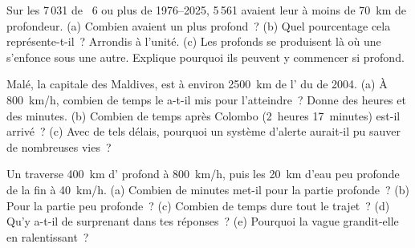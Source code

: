 \begin{exercise}[$\star\star$]\label{exo:g7:earthquakes:9}
Sur les 7\,031  de ~6 ou plus de 1976--2025, 5\,561
avaient leur  à moins de \qty{70}{km} de profondeur. (a) Combien
avaient un  plus profond~? (b) Quel pourcentage cela représente-t-il~?
Arrondis à l'unité. (c) Les  profonds se produisent là où une
 s'enfonce sous une autre. Explique pourquoi ils peuvent y commencer
si profond.
\end{exercise}

\begin{exercise}[$\star\star$]\label{exo:g7:earthquakes:10}
Malé, la capitale des Maldives, est à environ \qty{2500}{km} de
l' du  de 2004. (a) À \qty{800}{km/h}, combien de temps le
 a-t-il mis pour l'atteindre~? Donne des heures et des minutes. (b)
Combien de temps après Colombo (2~heures 17~minutes) est-il arrivé~? (c)
Avec de tels délais, pourquoi un système d'alerte aurait-il pu sauver de
nombreuses vies~?
\end{exercise}

\begin{exercise}[$\star\star\star$]\label{exo:g7:earthquakes:11}
Un  traverse \qty{400}{km} d' profond à \qty{800}{km/h}, puis
les \qty{20}{km} d'eau peu profonde de la fin à \qty{40}{km/h}. (a)
Combien de minutes met-il pour la partie profonde~? (b) Pour la partie peu
profonde~? (c) Combien de temps dure tout le trajet~? (d) Qu'y a-t-il de
surprenant dans tes réponses~? (e) Pourquoi la vague grandit-elle en
ralentissant~?
\end{exercise}

